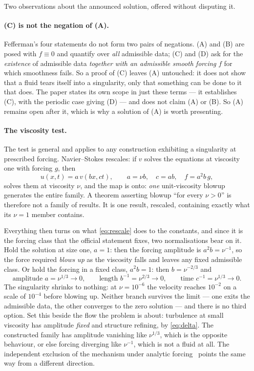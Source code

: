 \documentclass[11pt]{article}
\begin{document}
Two observations about the announced solution, offered without disputing it.

\paragraph{(C) is not the negation of (A).} Fefferman's four statements do not form two pairs of
negations. (A) and (B) are posed with $f\equiv0$ and quantify over \emph{all} admissible data;
(C) and (D) ask for the \emph{existence} of admissible data \emph{together with an admissible
smooth forcing} $f$ for which smoothness fails. So a proof of (C) leaves (A) untouched: it does not
show that a fluid tears itself into a singularity, only that something can be done to it that does.
The paper states its own scope in just these terms --- it establishes (C), with the periodic case
giving (D) --- and does not claim (A) or (B). So (A) remains open after it, which is why a solution
of (A) is worth presenting.

\paragraph{The viscosity test.} The test is general and applies to any construction exhibiting a
singularity at prescribed forcing. Navier--Stokes rescales: if $v$ solves the equations at viscosity
one with forcing $g$, then
\begin{equation}\label{eq:rescale}
u(x,t) = a\,v(bx,ct),\qquad a = \nu b,\quad c = ab,\quad f = a^2 b\,g,
\end{equation}
solves them at viscosity $\nu$, and the map is onto: \emph{one} unit-viscosity blowup generates the
entire family. A theorem asserting blowup ``for every $\nu>0$'' is therefore not a family of
results. It is one result, rescaled, containing exactly what its $\nu=1$ member contains.

Everything then turns on what \eqref{eq:rescale} does to the constants, and since it is the forcing
class that the official statement fixes, two normalisations bear on it. Hold the solution at size
one, $a=1$: then the forcing amplitude is $a^2b=\nu^{-1}$, so the force required \emph{blows up} as
the viscosity falls and leaves any fixed admissible class. Or hold the forcing in a fixed class,
$a^2b=1$: then $b=\nu^{-2/3}$ and
\begin{equation}\label{eq:shrink}
\text{amplitude } a = \nu^{1/3}\to 0,\qquad
\text{length } b^{-1} = \nu^{2/3}\to 0,\qquad
\text{time } c^{-1} = \nu^{1/3}\to 0 .
\end{equation}
The singularity shrinks to nothing: at $\nu=10^{-6}$ the velocity reaches $10^{-2}$ on a scale of
$10^{-4}$ before blowing up. Neither branch survives the limit --- one exits the admissible data,
the other converges to the zero solution --- and there is no third option. Set this beside the flow
the problem is about: turbulence at small viscosity has amplitude \emph{fixed} and structure
refining, by \eqref{eq:delta}. The constructed family has amplitude vanishing like $\nu^{1/3}$,
which is the opposite behaviour, or else forcing diverging like $\nu^{-1}$, which is not a fluid at
all. The independent exclusion of the mechanism under analytic forcing~\cite{civ} points the same
way from a different direction.
\end{document}
